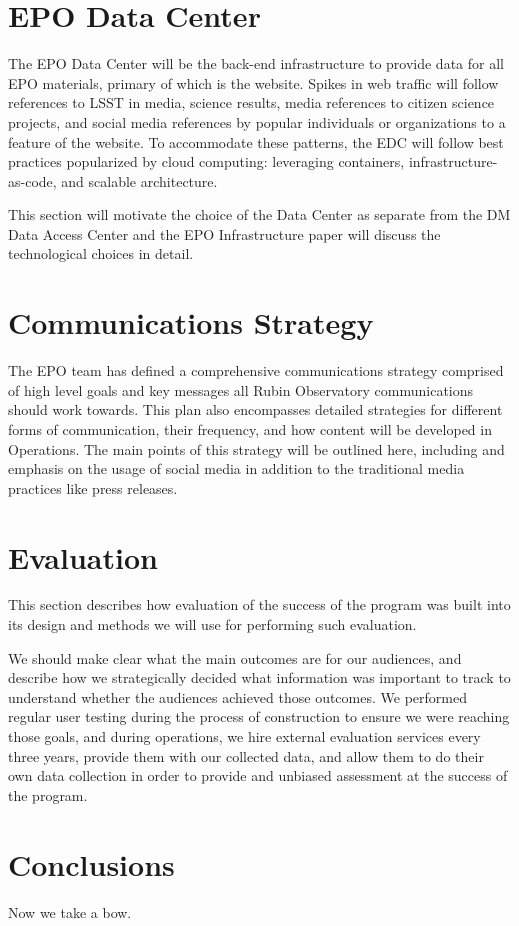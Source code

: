 \section{EPO Data Center}\label{sec:datacenter}
The EPO Data Center will be the back-end infrastructure to provide data for all EPO materials, primary of which is the website. 
Spikes in web traffic will follow references to LSST in media, science results, media references to citizen science projects, and social media references by popular individuals or organizations to a feature of the website. To accommodate these patterns, the EDC will follow best practices popularized by cloud computing: leveraging containers, infrastructure-as-code, and scalable architecture. 

This section will motivate the choice of the Data Center as separate from the DM Data Access Center and the EPO Infrastructure paper will discuss the technological choices in detail. 

\section{Communications Strategy}\label{sec:commsstrat}
The EPO team has defined a comprehensive communications strategy comprised of high level goals and key messages all Rubin Observatory communications should work towards. This plan also encompasses detailed strategies for different forms of communication, their frequency, and how content will be developed in Operations. The main points of this strategy will be outlined here, including and emphasis on the usage of social media in addition to the traditional media practices like press releases. 


\section{Evaluation}\label{sec:eval}

This section describes how evaluation of the success of the program was built into its design and methods we will use for performing such evaluation. 

We should make clear what the main outcomes are for our audiences, and describe how we strategically decided what information was important to track to understand whether the audiences achieved those outcomes.  We performed regular user testing during the process of construction to ensure we were reaching those goals, and during operations, we hire external evaluation services every three years, provide them with our collected data, and allow them to do their own data collection in order to provide and unbiased assessment at the success of the program.   

\section{Conclusions}\label{sec:conclusions}
Now we take a bow.